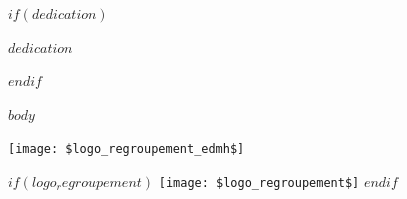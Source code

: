 \documentclass[a4paper,12pt]{reedthesis}
\begin{document}
$if(dedication)$
  \begin{dedication}
    $dedication$
  \end{dedication}
$endif$

\mainmatter %
\pagestyle{fancyplain} %

$body$


\newpage
\pagestyle{empty}
\hbox{\texttt{[image: \$logo\_regroupement\_edmh\$]}}


\bigskip
\noindent{}

\bigskip
\noindent{}

\vfill
$if(logo_regroupement)$
\hfill
\texttt{[image: \$logo\_regroupement\$]}
$endif$
\end{document}
